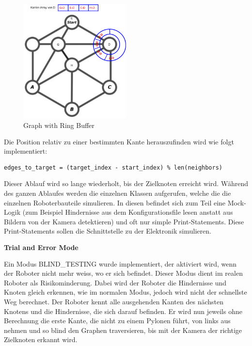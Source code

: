 \begin{figure}[H]
\centering
\includegraphics[width=0.5\textwidth]{assets/informatik-prototyp/simulator/ring-buffer-graph.png}
\caption{Graph with Ring Buffer}
\label{fig:ring-buffer-graph}
\end{figure}

Die Position relativ zu einer bestimmten Kante herauszufinden wird wie folgt implementiert:

\begin{verbatim}
edges_to_target = (target_index - start_index) % len(neighbors)
\end{verbatim}

Dieser Ablauf wird so lange wiederholt, bis der Zielknoten erreicht wird.
Während des ganzen Ablaufes werden die einzelnen Klassen aufgerufen, welche die die einzelnen Roboterbauteile simulieren. In diesen befindet sich zum Teil eine Mock-Logik (zum Beispiel Hindernisse aus dem Konfigurationsfile lesen anstatt aus Bildern von der Kamera detektieren) und oft nur simple Print-Statements. Diese Print-Statements sollen die Schnittstelle zu der Elektronik simulieren.

\textbf{Trial and Error Mode}

Ein Modus BLIND\_TESTING wurde implementiert, der aktiviert wird, wenn der Roboter nicht mehr weiss, wo er sich befindet. Dieser Modus dient im realen Roboter als Risikominderung. Dabei wird der Roboter die Hindernisse und Knoten gleich erkennen, wie im normalen Modus, jedoch wird nicht der schnellste Weg berechnet. Der Roboter kennt alle ausgehenden Kanten des nächsten Knotens und die Hindernisse, die sich darauf befinden. Er wird nun jeweils ohne Berechnung die erste Kante, die nicht zu einem Pylonen führt, von links aus nehmen und so blind den Graphen traversieren, bis mit der Kamera der richtige Zielknoten erkannt wird.

